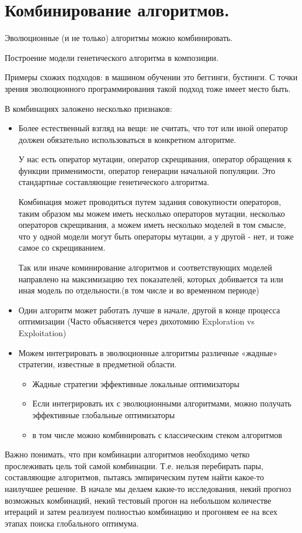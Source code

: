 \section{Комбинирование алгоритмов.}
Эволюционные (и не только) алгоритмы можно комбинировать.

Построение модели генетического алгоритма в композиции.

Примеры схожих подходов: в машином обучении это беггинги, бустинги. С точки зрения эволюционного программирования такой подход тоже имеет место быть.

В комбинациях заложено несколько признаков:
\begin{itemize}
    \item Более естественный взгляд на вещи: не считать, что тот или иной оператор должен обязательно использоваться в конкретном алгоритме.
    
    У нас есть оператор мутации, оператор скрещивания, оператор
    обращения к функции применимости, оператор генерации
    начальной популяции. Это стандартные составляющие
    генетического алгоритма.
    
    Комбинация может проводиться путем
    задания совокупности операторов, таким образом мы можем иметь
    несколько операторов мутации, несколько операторов
    скрещивания, а можем иметь несколько моделей в том смысле,
    что у одной модели могут быть операторы мутации, а у другой
    - нет, и тоже самое со скрещиванием.
    
    Так или иначе коминирование алгоритмов и соответствующих моделей направлено на максимизацию тех показателей, которых добивается та или иная модель по отдельности.(в том числе и во временном периоде)
    \item Один алгоритм может работать лучше в начале, другой в конце процесса оптимизации (Часто объясняется через дихотомию Exploration vs Exploitation)
    \item Можем интегрировать в эволюционные алгоритмы различные «жадные» стратегии, известные в предметной области. 
    \begin{itemize}
        \item Жадные стратегии эффективные локальные оптимизаторы
        \item Если интегрировать их с эволюционными алгоритмами, можно получать эффективные глобальные оптимизаторы
        \item в том числе можно комбинировать с классическим стеком алгоритмов
    \end{itemize}
\end{itemize}

Важно понимать, что при комбинации алгоритмов необходимо четко
прослеживать цель той самой комбинации. Т.е. нельзя перебирать
пары, составляющие  алгоритмов, пытаясь эмпирическим путем
найти какое-то наилучшее решение. В начале мы делаем какие-то
исследования, некий прогноз возможных комбинаций, некий тестовый
прогон на небольшом количестве итераций и затем реализуем
полностью комбинацию и прогоняем ее на всех этапах поиска глобального оптимума.
